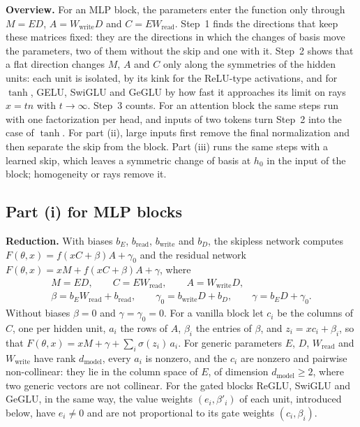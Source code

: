 \documentclass[10pt]{article}
\theoremstyle{definition}
\theoremstyle{remark}
\newcommand{\Wread}{W_{\mathrm{read}}}
\newcommand{\Wwrite}{W_{\mathrm{write}}}
\newcommand{\dm}{d_{\mathrm{model}}}
\newcommand{\para}[1]{\smallskip\noindent\textbf{#1}\hspace{0.5em}}
\begin{document}
\para{Overview.} For an MLP block, the parameters enter the function only through $M = ED$, $A = \Wwrite D$ and $C = E\Wread$. Step~1 finds the directions that keep these matrices fixed: they are the directions in which the changes of basis move the parameters, two of them without the skip and one with it. Step~2 shows that a flat direction changes $M$, $A$ and $C$ only along the symmetries of the hidden units: each unit is isolated, by its kink for the ReLU-type activations, and for $\tanh$, GELU, SwiGLU and GeGLU by how fast it approaches its limit on rays $x = tn$ with $t \to \infty$. Step~3 counts. For an attention block the same steps run with one factorization per head, and inputs of two tokens turn Step~2 into the case of $\tanh$. For part (ii), large inputs first remove the final normalization and then separate the skip from the block. Part (iii) runs the same steps with a learned skip, which leaves a symmetric change of basis at $h_0$ in the input of the block; homogeneity or rays remove it.

\subsection*{Part (i) for MLP blocks}

\para{Reduction.} With biases $b_E$, $b_{\mathrm{read}}$, $b_{\mathrm{write}}$ and $b_D$, the skipless network computes $F(\theta, x) = f(xC + \beta)A + \gamma_0$ and the residual network $F(\theta, x) = xM + f(xC + \beta)A + \gamma$, where
\begin{gather*}
M = ED,\qquad C = E\Wread,\qquad A = \Wwrite D,\\ \beta = b_E\Wread + b_{\mathrm{read}},\qquad \gamma_0 = b_{\mathrm{write}}D + b_D,\qquad \gamma = b_ED + \gamma_0 .
\end{gather*}
Without biases $\beta = 0$ and $\gamma = \gamma_0 = 0$. For a vanilla block let $c_i$ be the columns of $C$, one per hidden unit, $a_i$ the rows of $A$, $\beta_i$ the entries of $\beta$, and $z_i = xc_i + \beta_i$, so that $F(\theta, x) = xM + \gamma + \sum_i \sigma(z_i)\,a_i$. For generic parameters $E$, $D$, $\Wread$ and $\Wwrite$ have rank $\dm$, every $a_i$ is nonzero, and the $c_i$ are nonzero and pairwise non-collinear: they lie in the column space of $E$, of dimension $\dm \ge 2$, where two generic vectors are not collinear. For the gated blocks ReGLU, SwiGLU and GeGLU, in the same way, the value weights $(e_i, \beta'_i)$ of each unit, introduced below, have $e_i \neq 0$ and are not proportional to its gate weights $(c_i, \beta_i)$.
\end{document}

